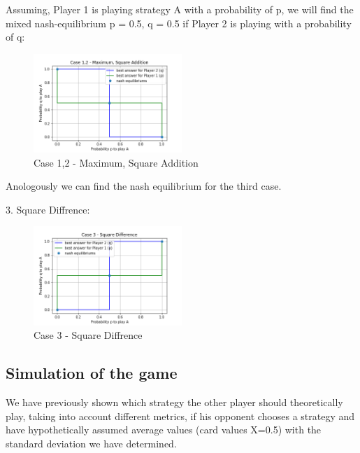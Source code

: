 Assuming, Player 1 is playing strategy A with a probability of p, we will find the mixed nash-equilibrium p = 0.5, q = 0.5 if Player 2 is playing with a probability of q:

\begin{figure}[!ht]
    \centering
    \includegraphics[width=0.5\textwidth]{Bilder/5_max}
    \caption{Case 1,2 - Maximum, Square Addition}
    \label{fig:meine-grafik}
\end{figure}

Anologously we can find the nash equilibrium for the third case.

3. Square Diffrence:

\begin{figure}[!ht]
    \centering
    \includegraphics[width=0.5\textwidth]{Bilder/5_diff}
    \caption{Case 3 - Square Diffrence}
    \label{fig:meine-grafik}
\end{figure}
\subsection{Simulation of the game}
We have previously shown which strategy the other player should theoretically play, taking into account different metrics, if his opponent chooses a strategy and have hypothetically assumed average values (card values X=0.5) with the standard deviation we have determined.

